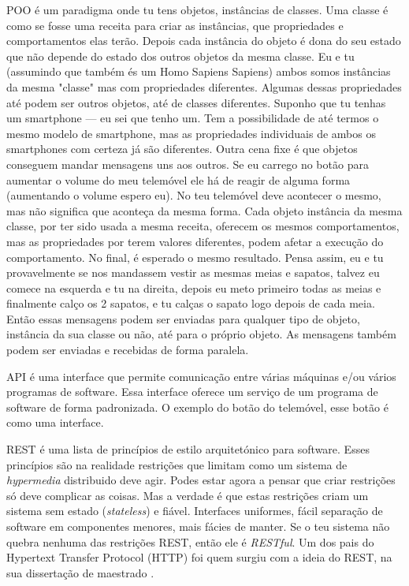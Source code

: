 \documentclass[12pt,a4paper,openright,oneside]{memoir}
\begin{document}
POO é um paradigma onde tu tens objetos, instâncias de classes. Uma classe é
como se fosse uma receita para criar as instâncias, que propriedades e
comportamentos elas terão. Depois cada instância do objeto é dona do seu estado
que não depende do estado dos outros objetos da mesma classe. Eu e tu
(assumindo que também és um Homo Sapiens Sapiens) ambos somos instâncias da
mesma "classe" mas com propriedades diferentes. Algumas dessas propriedades até
podem ser outros objetos, até de classes diferentes. Suponho que tu tenhas um
smartphone --- eu sei que tenho um. Tem a possibilidade de até termos o mesmo
modelo de smartphone, mas as propriedades individuais de ambos os smartphones
com certeza já são diferentes. Outra cena fixe é que objetos conseguem mandar
mensagens uns aos outros. Se eu carrego no botão para aumentar o volume do meu
telemóvel ele há de reagir de alguma forma (aumentando o volume espero eu). No
teu telemóvel deve acontecer o mesmo, mas não significa que aconteça da mesma
forma. Cada objeto instância da mesma classe, por ter sido usada a mesma
receita, oferecem os mesmos comportamentos, mas as propriedades por terem
valores diferentes, podem afetar a execução do comportamento. No final, é
esperado o mesmo resultado. Pensa assim, eu e tu provavelmente se nos mandassem
vestir as mesmas meias e sapatos, talvez eu comece na esquerda e tu na direita,
depois eu meto primeiro todas as meias e finalmente calço os 2 sapatos, e tu
calças o sapato logo depois de cada meia. Então essas mensagens podem ser
enviadas para qualquer tipo de objeto, instância da sua classe ou não, até para
o próprio objeto. As mensagens também podem ser enviadas e recebidas de forma
paralela.

API é uma interface que permite comunicação entre várias máquinas e/ou vários
programas de software. Essa interface oferece um serviço de um programa de
software de forma padronizada. O exemplo do botão do telemóvel, esse botão é
como uma interface.

REST é uma lista de princípios de estilo arquitetónico para software. Esses
princípios são na realidade restrições que limitam como um sistema de
\textit{hypermedia} distribuido deve agir. Podes estar agora a pensar que criar
restrições só deve complicar as coisas. Mas a verdade é que estas restrições
criam um sistema sem estado (\textit{stateless}) e fiável. Interfaces
uniformes, fácil separação de software em componentes menores, mais fácies de
manter. Se o teu sistema não quebra nenhuma das restrições REST, então ele é
\textit{RESTful}. Um dos pais do Hypertext Transfer Protocol (HTTP) foi quem
surgiu com a ideia do REST, na sua dissertação de maestrado
\autocite{fielding2000rest}.
\end{document}
